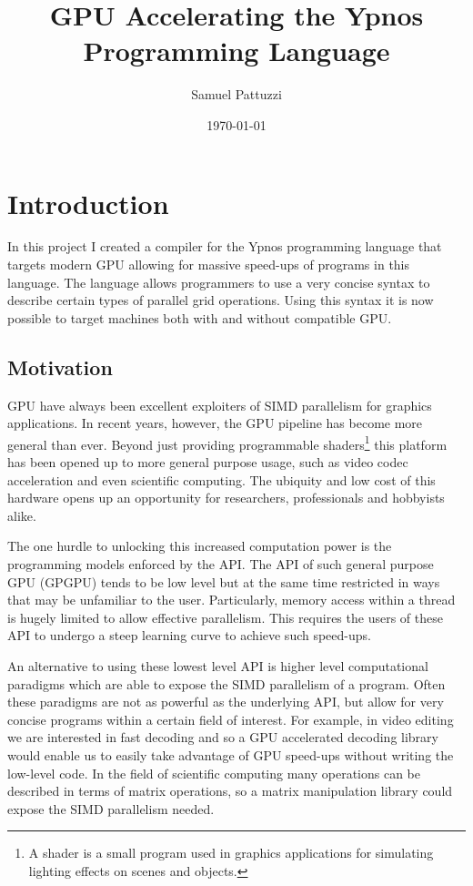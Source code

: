 \documentclass[12pt,a4paper,oneside]{scrbook}
\title{GPU Accelerating the Ypnos Programming Language}
\author{Samuel Pattuzzi}
\date{\today}
\begin{document}
\frontmatter

\maketitle



\mainmatter
\chapter{Introduction}

In this project I created a compiler for the Ypnos programming language that
targets modern GPU allowing for massive speed-ups of programs in this
language. The language allows programmers to use a very concise syntax to
describe certain types of parallel grid operations. Using this syntax it is now
possible to target machines both with and without compatible GPU.

\section{Motivation}

GPU have always been excellent exploiters of SIMD parallelism for graphics
applications. In recent years, however, the GPU pipeline has become more general
than ever. Beyond just providing programmable shaders\footnote{A shader is a
  small program used in graphics applications for simulating lighting effects on
  scenes and objects.} this platform has been opened up to more general purpose
usage, such as video codec acceleration and even scientific computing. The
ubiquity and low cost of this hardware opens up an opportunity for researchers,
professionals and hobbyists alike.

The one hurdle to unlocking this increased computation power is the programming
models enforced by the API. The API of such general purpose GPU (GPGPU) tends to
be low level but at the same time restricted in ways that may be unfamiliar to
the user. Particularly, memory access within a thread is hugely limited to allow
effective parallelism. This requires the users of these API to undergo a steep
learning curve to achieve such speed-ups.

An alternative to using these lowest level API is higher level computational
paradigms which are able to expose the SIMD parallelism of a program. Often
these paradigms are not as powerful as the underlying API, but allow for very
concise programs within a certain field of interest. For example, in video
editing we are interested in fast decoding and so a GPU accelerated decoding
library would enable us to easily take advantage of GPU speed-ups without
writing the low-level code. In the field of scientific computing many operations
can be described in terms of matrix operations, so a matrix manipulation library
could expose the SIMD parallelism needed.
\end{document}
